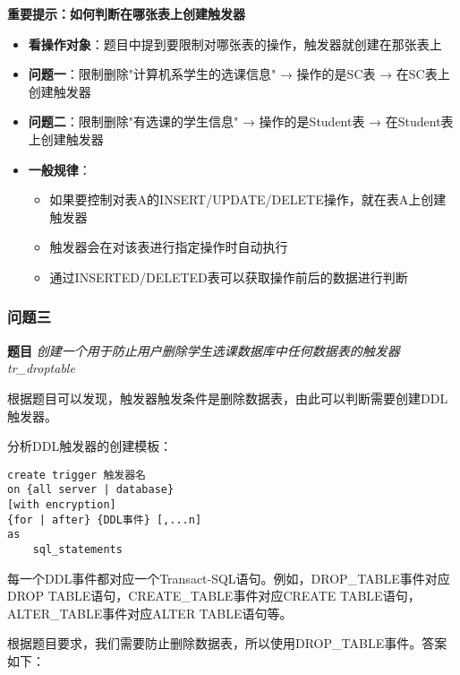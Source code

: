 \begin{mdframed}[backgroundcolor=yellow!10]
  \textbf{重要提示：如何判断在哪张表上创建触发器}

  \begin{itemize}
    \item \textbf{看操作对象}：题目中提到要限制对哪张表的操作，触发器就创建在那张表上
    \item \textbf{问题一}：限制删除"计算机系学生的选课信息" → 操作的是SC表 → 在SC表上创建触发器
    \item \textbf{问题二}：限制删除"有选课的学生信息" → 操作的是Student表 → 在Student表上创建触发器
    \item \textbf{一般规律}：
      \begin{itemize}
        \item 如果要控制对表A的INSERT/UPDATE/DELETE操作，就在表A上创建触发器
        \item 触发器会在对该表进行指定操作时自动执行
        \item 通过INSERTED/DELETED表可以获取操作前后的数据进行判断
      \end{itemize}
  \end{itemize}
\end{mdframed}

\subsubsection{问题三}

\textbf{题目} \emph{创建一个用于防止用户删除学生选课数据库中任何数据表的触发器tr\_droptable}

\vspace{6pt}

\qquad 根据题目可以发现，触发器触发条件是删除数据表，由此可以判断需要创建DDL触发器。

\qquad 分析DDL触发器的创建模板：

\begin{mdframed}[backgroundcolor=gray!10]
\begin{verbatim}
create trigger 触发器名
on {all server | database}
[with encryption]
{for | after} {DDL事件} [,...n]
as
    sql_statements
\end{verbatim}
\end{mdframed}

\qquad 每一个DDL事件都对应一个Transact-SQL语句。例如，DROP\_TABLE事件对应DROP TABLE语句，CREATE\_TABLE事件对应CREATE TABLE语句，ALTER\_TABLE事件对应ALTER TABLE语句等。

\qquad 根据题目要求，我们需要防止删除数据表，所以使用DROP\_TABLE事件。答案如下：

